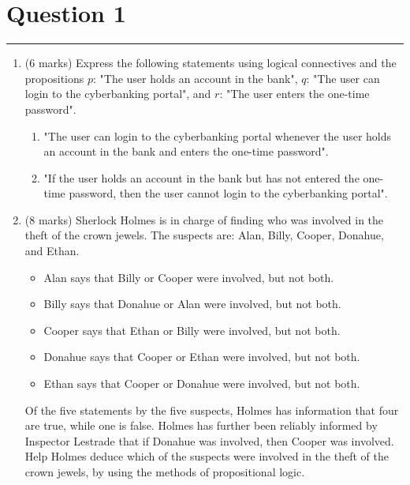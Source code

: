 \documentclass{article}
\begin{document}

\section*{Question 1}
\hrule
\vspace{0.5cm}


\begin{enumerate}[label=\alph*.]
    \item (6 marks) Express the following statements using logical connectives and the propositions \( p \): "The user holds an account in the bank", \( q \): "The user can login to the cyberbanking portal", and \( r \): "The user enters the one-time password".
          \begin{enumerate}[label=\roman*.]
              \item "The user can login to the cyberbanking portal whenever the user holds an account in the bank and enters the one-time password".
              \item "If the user holds an account in the bank but has not entered the one-time password, then the user cannot login to the cyberbanking portal".
          \end{enumerate}
    \item (8 marks) Sherlock Holmes is in charge of finding who was involved in the theft of the crown jewels. The suspects are: Alan, Billy, Cooper, Donahue, and Ethan.
          \begin{itemize}
              \item Alan says that Billy or Cooper were involved, but not both.
              \item Billy says that Donahue or Alan were involved, but not both.
              \item Cooper says that Ethan or Billy were involved, but not both.
              \item Donahue says that Cooper or Ethan were involved, but not both.
              \item Ethan says that Cooper or Donahue were involved, but not both.
          \end{itemize}
          Of the five statements by the five suspects, Holmes has information that four are true, while one is false. Holmes has further been reliably informed by Inspector Lestrade that if Donahue was involved, then Cooper was involved. Help Holmes deduce which of the suspects were involved in the theft of the crown jewels, by using the methods of propositional logic.
\end{enumerate}
\end{document}
